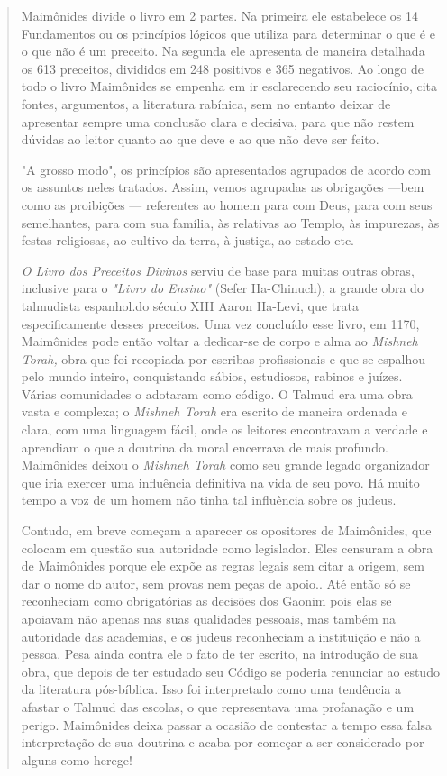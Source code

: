 \begin{quote}
Maimônides divide o livro em 2 partes. Na primeira ele estabelece os 14
Fundamentos ou os princípios lógicos que utiliza para determinar o que é
e o que não é um preceito. Na segunda ele apresenta de maneira detalhada
os 613 preceitos, divididos em 248 positivos e 365 negativos. Ao longo
de to­do o livro Maimônides se empenha em ir esclarecendo seu
raciocínio, cita fon­tes, argumentos, a literatura rabínica, sem no
entanto deixar de apresentar sem­pre uma conclusão clara e decisiva,
para que não restem dúvidas ao leitor quanto ao que deve e ao que não
deve ser feito.

"A grosso modo", os princípios são apresentados agrupados de acor­do com
os assuntos neles tratados. Assim, vemos agrupadas as obrigações ---bem
como as proibições --- referentes ao homem para com Deus, para com seus
semelhantes, para com sua família, às relativas ao Templo, às impurezas,
às festas religiosas, ao cultivo da terra, à justiça, ao estado etc.

\emph{O Livro dos Preceitos Divinos} serviu de base para muitas outras
obras, inclusive para o \emph{"Livro do Ensino"} (Sefer Ha-Chinuch), a
grande obra do tal­mudista espanhol.do século XIII Aaron Ha-Levi, que
trata especificamente des­ses preceitos.
Uma vez concluído esse livro, em 1170, Maimônides pode então vol­tar a
dedicar-se de corpo e alma ao \emph{Mishneh Torah,} obra que foi
recopiada por escribas profissionais e que se espalhou pelo mundo
inteiro, conquistando sá­bios, estudiosos, rabinos e juízes. Várias
comunidades o adotaram como códi­go. O Talmud era uma obra vasta e
complexa; o \emph{Mishneh Torah} era escrito de maneira ordenada e
clara, com uma linguagem fácil, onde os leitores encontra­vam a verdade
e aprendiam o que a doutrina da moral encerrava de mais pro­fundo.
Maimônides deixou o \emph{Mishneh Torah} como seu grande legado
organi­zador que iria exercer uma influência definitiva na vida de seu
povo. Há muito tempo a voz de um homem não tinha tal influência sobre os
judeus.

Contudo, em breve começam a aparecer os opositores de Maimôni­des, que
colocam em questão sua autoridade como legislador. Eles censuram a obra
de Maimônides porque ele expõe as regras legais sem citar a origem, sem
dar o nome do autor, sem provas nem peças de apoio.. Até então só se
reconhe­ciam como obrigatórias as decisões dos Gaonim pois elas se
apoiavam não ape­nas nas suas qualidades pessoais, mas também na
autoridade das academias, e os judeus reconheciam a instituição e não a
pessoa. Pesa ainda contra ele o fato de ter escrito, na introdução de
sua obra, que depois de ter estudado seu Códi­go se poderia renunciar ao
estudo da literatura pós-bíblica. Isso foi interpreta­do como uma
tendência a afastar o Talmud das escolas, o que representava uma
profanação e um perigo. Maimônides deixa passar a ocasião de contestar a
tem­po essa falsa interpretação de sua doutrina e acaba por começar a
ser conside­rado por alguns como herege!


\end{quote}
